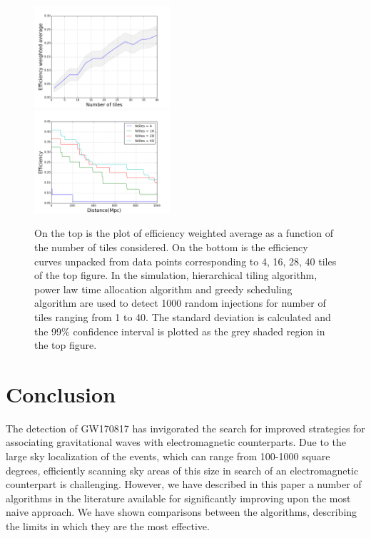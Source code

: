 \documentclass[twocolumn]{aastex61}
\begin{document}
\begin{figure}[b]
    \centering
    \includegraphics[width=0.45\textwidth]{plots/eff_ntiles.png}\\
    \includegraphics[width=0.45\textwidth]{plots/eff_ntiles_curves.png}
    \caption{On the top is the plot of efficiency weighted average as a function of the number of tiles considered. On the bottom is the efficiency curves unpacked from data points corresponding to 4, 16, 28, 40 tiles of the top figure. In the simulation, hierarchical tiling algorithm, power law time allocation algorithm and greedy scheduling algorithm are used to detect 1000 random injections for number of tiles ranging from 1 to 40. The standard deviation is calculated and the 99\% confidence interval is plotted as the grey shaded region in the top figure.}
    \label{fig:eff_ntiles}
\end{figure}

\section{Conclusion}
\label{sec:conclusions}

The detection of GW170817 \citep{AbEA2017b} has invigorated the search for improved strategies for associating gravitational waves with electromagnetic
counterparts.
Due to the large sky localization of the events, which can range from 100-1000 square degrees, efficiently scanning sky areas  of this size in search of an electromagnetic counterpart is challenging.
However, we have described in this paper a number of algorithms in the literature available for significantly improving upon the most naive approach.
We have shown comparisons between the algorithms, describing the limits in which they are the most effective.
\end{document}
